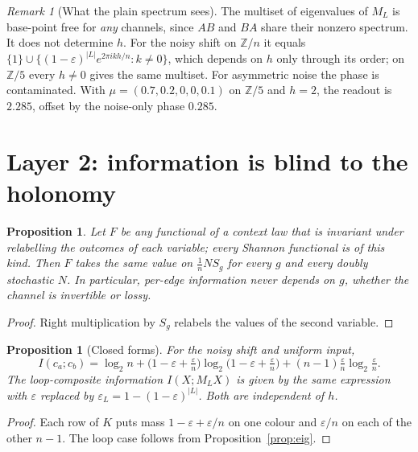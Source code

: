 \documentclass[11pt]{article}
\newtheorem{proposition}[theorem]{Proposition}
\theoremstyle{definition}
\theoremstyle{remark}
\newtheorem{remark}[theorem]{Remark}
\newcommand{\Z}{\mathbb{Z}}
\begin{document}
\begin{remark}[What the plain spectrum sees]
The multiset of eigenvalues of $M_L$ is base-point free for \emph{any} channels, since $AB$ and $BA$ share their nonzero spectrum. It does not determine $h$. For the noisy shift on $\Z/n$ it equals $\{1\}\cup\{(1-\varepsilon)^{|L|}e^{2\pi i kh/n}:k\neq0\}$, which depends on $h$ only through its order; on $\Z/5$ every $h\neq0$ gives the same multiset. For asymmetric noise the phase is contaminated. With $\mu=(0.7,0.2,0,0,0.1)$ on $\Z/5$ and $h=2$, the readout is $2.285$, offset by the noise-only phase $0.285$.
\end{remark}

\section{Layer 2: information is blind to the holonomy}

\begin{proposition}\label{prop:blind}
Let $F$ be any functional of a context law that is invariant under relabelling the outcomes of each variable; every Shannon functional is of this kind. Then $F$ takes the same value on $\tfrac1nN S_g$ for every $g$ and every doubly stochastic $N$. In particular, per-edge information never depends on $g$, whether the channel is invertible or lossy.
\end{proposition}
\begin{proof}
Right multiplication by $S_g$ relabels the values of the second variable.
\end{proof}

\begin{proposition}[Closed forms]\label{prop:info}
For the noisy shift and uniform input,
\[
I(c_a;c_b)=\log_2 n+\Big(1-\varepsilon+\tfrac{\varepsilon}{n}\Big)\log_2\Big(1-\varepsilon+\tfrac{\varepsilon}{n}\Big)+(n-1)\tfrac{\varepsilon}{n}\log_2\tfrac{\varepsilon}{n}.
\]
The loop-composite information $I(X;M_LX)$ is given by the same expression with $\varepsilon$ replaced by $\varepsilon_L=1-(1-\varepsilon)^{|L|}$. Both are independent of $h$.
\end{proposition}
\begin{proof}
Each row of $K$ puts mass $1-\varepsilon+\varepsilon/n$ on one colour and $\varepsilon/n$ on each of the other $n-1$. The loop case follows from Proposition~\ref{prop:eig}.
\end{proof}
\end{document}
